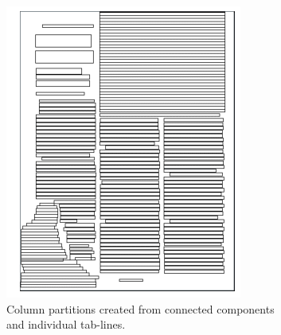 \begin{figure}[p]
\begin{subfigure}{0.30\textwidth}
\includegraphics[width=\linewidth]{img/tabStopDetection/tessPageSegm3.png}
\caption{Column partitions created from connected components and individual tab-lines.}
\label{fig:segmentationTesseract3}
\end{subfigure}
\\
\begin{subfigure}{0.30\textwidth}

\end{subfigure}
\end{figure}
